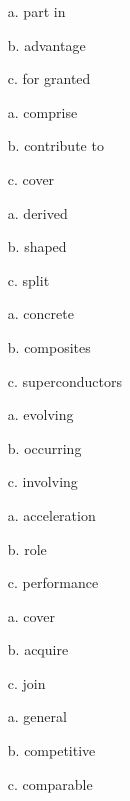 \begin{enumerate}
      \item[a.] part in
      \item[b.] advantage
      \item[c.] for granted
\end{enumerate}

\begin{enumerate}
      \item[a.] comprise
      \item[b.] contribute to
      \item[c.] cover
\end{enumerate}

\begin{enumerate}
      \item[a.] derived
      \item[b.] shaped
      \item[c.] split
\end{enumerate}

\begin{enumerate}
      \item[a.] concrete
      \item[b.] composites
      \item[c.] superconductors
\end{enumerate}

\begin{enumerate}
      \item[a.] evolving
      \item[b.] occurring
      \item[c.] involving
\end{enumerate}

\begin{enumerate}
      \item[a.] acceleration
      \item[b.] role
      \item[c.] performance
\end{enumerate}

\begin{enumerate}
      \item[a.] cover
      \item[b.] acquire
      \item[c.] join
\end{enumerate}

\begin{enumerate}
      \item[a.] general
      \item[b.] competitive
      \item[c.] comparable
\end{enumerate}


